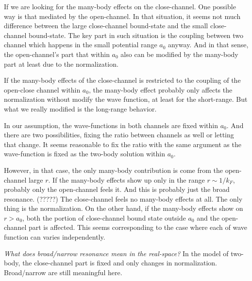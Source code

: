 If we are looking for the many-body effects on the close-channel.  One possible way is that mediated by the open-channel.  In that situation, it seems not much difference between the large close-channel bound-state and the small close-channel bound-state.  The key part in such situation is the coupling between two channel which happens in the small potential range $a_0$ anyway. And in that sense, the open-channel's part that within $a_0$ also can be modified by the many-body part at least due to the normalization.  

If the many-body effects of the close-channel is restricted to the coupling of the open-close channel within $a_0$, the many-body effect probably only affects the normalization without modify the wave function, at least for the short-range. But what we really modified is the long-range behavior. 

In our assumption, the wave-functions  in both channels are fixed within $a_0$.   And there are two possibilities, fixing the ratio between channels as well or letting that change. It seems reasonable to fix the ratio with the same argument as the wave-function is fixed as the two-body solution within $a_0$.  

However, in that case, the only many-body contribution is come from the open-channel large $r$.   If the many-body effects show up only in the range $r\sim{}1/{k_F}$, probably only the open-channel feels it.  And this is probably just the broad resonance.  (?????) The close-channel feels no many-body effects at all.  The only thing is the normalization.  On the other hand, if the many-body effects show on $r>a_0$, both the portion of close-channel bound state outside $a_0$ and the open-channel part is affected.  This seems corresponding to the case where each of wave function can varies independently.  

\emph{What does broad/narrow resonance mean in the real-space?}
In the model of two-body, the close-channel part is fixed and only changes in normalization.  Broad/narrow are still meaningful here.  
